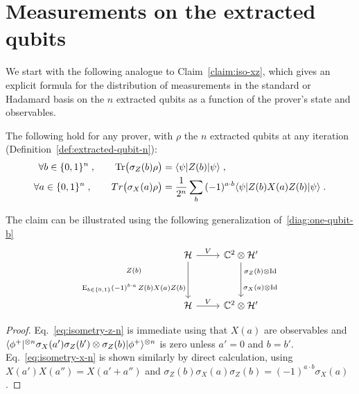 \section{Measurements on the extracted qubits}
\label{sec:nqubit-measurements}

We start with the following analogue to Claim~\ref{claim:iso-xz}, which gives an explicit formula for the distribution of measurements in the standard or Hadamard basis on the $n$ extracted qubits as a function of the prover's state and observables. 

\begin{claim}\label{claim:iso-xz-n}
The following hold for any prover, with $\rho$ the $n$ extracted qubits at any iteration (Definition~\ref{def:extracted-qubit-n}):
\begin{align}
\forall b\in \{0,1\}^n\;,\qquad \mbox{\rm Tr}\big(\sigma_Z(b) \rho \big)  &=\langle\psi| Z(b) |\psi\rangle\;,\label{eq:isometry-z-n}\\
\forall a\in \{0,1\}^n\;,\qquad Tr\big(\sigma_X(a) \rho \big)  &= \frac{1}{2^n} \sum_b \, (-1)^{a\cdot b} \langle\psi| Z(b) X(a) Z(b) |\psi\rangle \;.\label{eq:isometry-x-n}
\end{align}
\end{claim}

The claim can be illustrated using the following generalization of~\eqref{diag:one-qubit-b}
\begin{equation}\label{diag:one-qubit-c}
\begin{tikzcd}
\mH  \arrow{r}{V}  \arrow[swap]{dd}{\substack{Z(b) \\[3mm] \Es{b\in\{0,1\}} (-1)^{b\cdot a}\, Z(b)X(a)Z(b) }} &  \C^2 \otimes \mH' \arrow{dd}{\substack{\sigma_Z(b)\otimes \Id\\[3mm] \sigma_X(a)\otimes \Id}} \\
&\\ 
\mH  \arrow{r}{V} & \C^2 \otimes \mH'
\end{tikzcd}
\end{equation}


\begin{proof}
Eq.~\eqref{eq:isometry-z-n} is immediate using that $X(a)$ are observables and $\langle\phi^+|^{\otimes n} \sigma_X(a')\sigma_Z(b') \otimes \sigma_Z(b) |\phi^+\rangle^{\otimes n}$ is zero unless $a'=0$ and $b=b'$. Eq.~\eqref{eq:isometry-x-n} is shown similarly by direct calculation, using $X(a')X(a'')=X(a'+a'')$ and $\sigma_Z(b)\sigma_X(a)\sigma_Z(b)=(-1)^{a\cdot b}\sigma_X(a)$. 
\end{proof}

